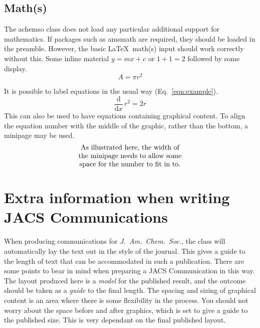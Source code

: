 \documentclass[journal=asbcd6,manuscript=article]{achemso}
\begin{document}
\subsection{Math(s)}

The \textsf{achemso} class does not load any particular additional
support for mathematics.  If packages such as \textsf{amsmath} are
required, they should be loaded in the preamble.  However,
the basic \LaTeX\ math(s) input should work correctly without
this.  Some inline material \( y = mx + c \) or $ 1 + 1 = 2 $
followed by some display. \[ A = \pi r^2 \]

It is possible to label equations in the usual way (Eq.~\ref{eqn:example}).
\begin{equation}
  \frac{\mathrm{d}}{\mathrm{d}x} \, r^2 = 2r \label{eqn:example}
\end{equation}
This can also be used to have equations containing graphical
content. To align the equation number with the middle of the graphic,
rather than the bottom, a minipage may be used.
\begin{equation}
  \begin{minipage}[c]{0.80\linewidth}
    \centering
    As illustrated here, the width of \\
    the minipage needs to allow some  \\
    space for the number to fit in to.
  \end{minipage}
  \label{eqn:graphic}
\end{equation}


\section{Extra information when writing JACS Communications}

When producing communications for \emph{J.~Am.\ Chem.\ Soc.}, the
class will automatically lay the text out in the style of the
journal. This gives a guide to the length of text that can be
accommodated in such a publication. There are some points to bear in
mind when preparing a JACS Communication in this way.  The layout
produced here is a \emph{model} for the published result, and the
outcome should be taken as a \emph{guide} to the final length. The
spacing and sizing of graphical content is an area where there is
some flexibility in the process.  You should not worry about the
space before and after graphics, which is set to give a guide to the
published size. This is very dependant on the final published layout.
\end{document}
